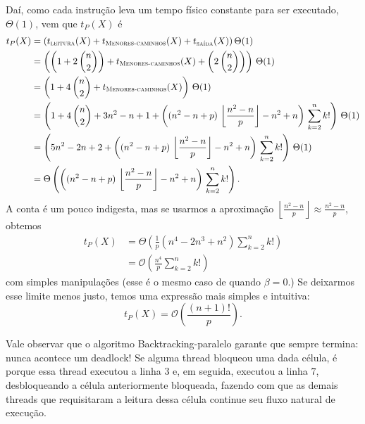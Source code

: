 \documentclass[a4paper,article,10pt]{article}
\newcommand{\parenteses}[1] {\left ( {#1} \right )}
\newcommand{\floor}[1] {\left \lfloor {#1} \right \rfloor}
\newcommand{\floorfrac}[2] {\floor{\frac{#1}{#2}}}
\begin{document}
    Daí, como cada instrução leva um tempo físico constante para ser executado,
    $\Theta(1)$, vem que $t_P(X)$ é 
    \begin{align*}
      t_P(X) &= (t_{\textsc{leitura}}(X) + t_{\textsc{Menores-caminhos}}(X)
                + t_{\textsc{saída}}(X))\,\Theta(1) \\
             &= \parenteses{\parenteses{1 + 2\,\binom{n}{2}} +
               t_{\textsc{Menores-caminhos}}(X) + \parenteses{2\,\binom{n}{2}}
               }\,\Theta(1) \\
             &= \parenteses{1 + 4\,\binom{n}{2} +
                  t_{\textsc{Menores-caminhos}}(X)}\,\Theta(1) \\
             &= \parenteses{1 + 4\,\binom{n}{2} +
                  3n^2 - n + 1 + \parenteses{(n^2 - n + p)\,\floorfrac{n^2-n}{p}
                    - n^2 + n}\,\sum_{k=2}^n k!}\,\Theta(1) \\
             &= \parenteses{5n^2 - 2n + 2
                  + \parenteses{(n^2 - n + p)\,\floorfrac{n^2-n}{p}
                    - n^2 + n}\,\sum_{k=2}^n k!}\,\Theta(1) \\
             &= \Theta\parenteses{\parenteses{(n^2 - n+p)\,\floorfrac{n^2-n}{p}
                    - n^2 + n}\,\sum_{k=2}^n k!}.
    \end{align*}
    A conta é um pouco indigesta, mas se usarmos a aproximação
    $\floorfrac{n^2-n}{p} \approx \frac{n^2-n}{p}$, obtemos
    \begin{align*}
      t_P(X) &= \Theta\parenteses{\frac{1}{p} (n^4-2n^3+n^2) \sum_{k=2}^n k!} \\
             &= \mathcal{O}\parenteses{\frac{n^4}{p} \sum_{k=2}^n k!}
    \end{align*}
    com simples manipulações (esse é o mesmo caso de quando $\beta = 0$.)
    Se deixarmos esse limite menos justo, temos uma expressão mais simples e
    intuitiva:
    \begin{equation*}
      t_P(X) = \mathcal{O}\parenteses{\frac{(n+1)!}{p}}.
    \end{equation*}

    Vale observar que o algoritmo {\sc Backtracking-paralelo} garante que sempre
    termina: nunca acontece um deadlock! Se alguma thread bloqueou uma dada
    célula, é porque essa thread executou a linha $3$ e, em seguida, executou a
    linha $7$, desbloqueando a célula anteriormente bloqueada, fazendo com que
    as demais threads que requisitaram a leitura dessa célula continue seu fluxo
    natural de execução.
\end{document}
